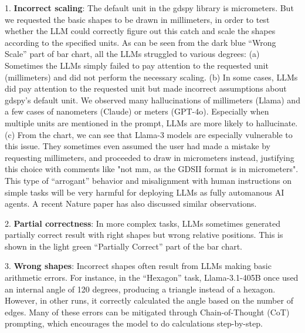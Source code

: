 \documentclass{article}
\begin{document}
  1. \textbf{Incorrect scaling}: The default unit in the gdspy library is micrometers. But we requested the basic shapes to be drawn in millimeters, in order to test whether the LLM could correctly figure out this catch and scale the shapes according to the specified units. As can be seen from the dark blue ``Wrong Scale'' part of bar chart, all the LLMs struggled to various degrees: (a) Sometimes the LLMs simply failed to pay attention to the requested unit (millimeters) and did not perform the necessary scaling. (b) In some cases, LLMs did pay attention to the requested unit but made incorrect assumptions about gdspy's default unit. We observed many hallucinations of millimeters (Llama) and a few cases of nanometers (Claude) or meters (GPT-4o). Especially when multiple units are mentioned in the prompt, LLMs are more likely to hallucinate. (c) From the chart, we can see that Llama-3 models are especially vulnerable to this issue. They sometimes even assumed the user had made a mistake by requesting millimeters, and proceeded to draw in micrometers instead, justifying this choice with comments like "not mm, as the GDSII format is in micrometers". This type of ``arrogant'' behavior and misalignment with human instructions on simple tasks will be very harmful for deploying LLMs as fully automanous AI agents. A recent Nature paper \cite{ZhouNature2024} has also discussed similar observations.
  
  2. \textbf{Partial correctness}: In more complex tasks, LLMs sometimes generated partially correct result with right shapes but wrong relative positions. This is shown in the light green ``Partially Correct'' part of the bar chart.
  
  3. \textbf{Wrong shapes}: Incorrect shapes often result from LLMs making basic arithmetic errors. For instance, in the ``Hexagon'' task, Llama-3.1-405B once used an internal angle of 120 degrees, producing a triangle instead of a hexagon. However, in other runs, it correctly calculated the angle based on the number of edges. Many of these errors can be mitigated through Chain-of-Thought (CoT) prompting, which encourages the model to do calculations step-by-step.
\end{document}
